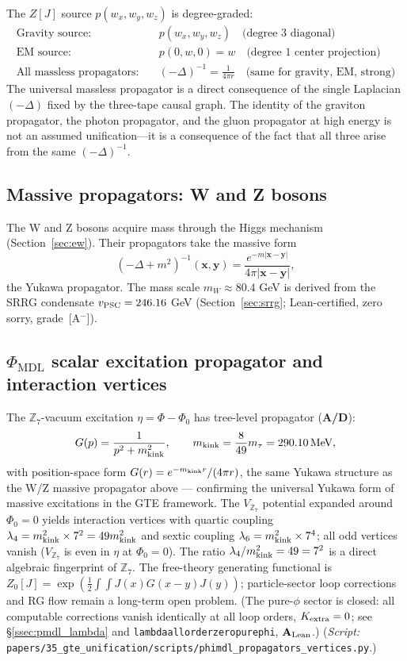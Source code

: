 \documentclass[11pt]{article}
\theoremstyle{remark}
\newcommand{\PHIMDL}{\Phi_{\mathrm{MDL}}}
\newcommand{\lean}[1]{%
  \penalty-100
  \begingroup\def\_{\textunderscore\allowbreak}\texttt{#1}\endgroup}
\newcommand{\CatAL}{\ensuremath{\textbf{A}_{\rm Lean}}}
\newcommand{\CatAD}{\textbf{A/D}}
\begin{document}
The $Z[J]$ source $p(w_x,w_y,w_z)$ is degree-graded:
\begin{align}
  \text{Gravity source:} &\quad p(w_x,w_y,w_z) \quad \text{(degree 3 diagonal)}\\
  \text{EM source:} &\quad p(0,w,0) = w \quad \text{(degree 1 center projection)}\\
  \text{All massless propagators:} &\quad (-\Delta)^{-1} = \frac{1}{4\pi r}
  \quad \text{(same for gravity, EM, strong)}
\end{align}
The universal massless propagator is a direct consequence of the single
Laplacian $(-\Delta)$ fixed by the three-tape causal graph. The identity of
the graviton propagator, the photon propagator, and the gluon propagator at
high energy is not an assumed unification---it is a consequence of the fact
that all three arise from the same $(-\Delta)^{-1}$.

\subsection{Massive propagators: W and Z bosons}
\label{ssec:massive}

The W and Z bosons acquire mass through the Higgs mechanism (Section~\ref{sec:ew}).
Their propagators take the massive form
\[
  (-\Delta + m^2)^{-1}(\mathbf{x},\mathbf{y})
  = \frac{e^{-m|\mathbf{x}-\mathbf{y}|}}{4\pi|\mathbf{x}-\mathbf{y}|},
\]
the Yukawa propagator. The mass scale $m_W \approx 80.4$ GeV is derived from the
SRRG condensate $v_{\rm PSC} = 246.16$ GeV (Section~\ref{sec:srrg}; Lean-certified,
zero sorry, grade~[A$^-$]).

\subsection{$\PHIMDL$ scalar excitation propagator and interaction vertices}
\label{ssec:scalar_propagator}

The $\mathbb{Z}_7$-vacuum excitation $\eta = \Phi - \Phi_0$ has tree-level propagator
(\CatAD):
\[
  G(p) = \frac{1}{p^2 + m_{\rm kink}^2}, \qquad
  m_{\rm kink} = \frac{8}{49}m_\tau = 290.10\,\text{MeV},
\]
with position-space form $G(r) = e^{-m_{\rm kink} r}/(4\pi r)$, the same Yukawa
structure as the W/Z massive propagator above --- confirming the universal Yukawa
form of massive excitations in the GTE framework.
The $V_{\mathbb{Z}_7}$ potential expanded around $\Phi_0 = 0$ yields interaction
vertices with quartic coupling $\lambda_4 = m_{\rm kink}^2\times 7^2 = 49m_{\rm kink}^2$
and sextic coupling $\lambda_6 = m_{\rm kink}^2\times 7^4$; all odd vertices vanish
($V_{\mathbb{Z}_7}$ is even in $\eta$ at $\Phi_0=0$).  The ratio $\lambda_4/m_{\rm kink}^2
= 49 = 7^2$ is a direct algebraic fingerprint of $\mathbb{Z}_7$.
The free-theory generating functional is $Z_0[J] = \exp(\tfrac{1}{2}\int\!\int J(x)G(x-y)J(y))$;
particle-sector loop corrections and RG flow remain a long-term open problem.
(The pure-$\phi$ sector is closed: all computable corrections vanish identically
at all loop orders, $K_{\rm extra} = 0$; see \S\ref{ssec:pmdl_lambda} and
\lean{lambda\_all\_order\_zero\_pure\_phi}, $\CatAL$.)
(\textit{Script:} \texttt{papers/35\_gte\_unification/scripts/phimdl\_propagators\_vertices.py}.)
\end{document}
